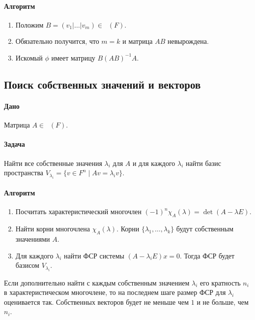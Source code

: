 \documentclass{article}
\newcommand{\MatrixDim}[3]{\mathop{\mathrm{M}_{#2\,#3}}(#1)}
\newcommand{\Matrix}[2]{\mathop{\mathrm{M}_{#2}}(#1)}
\begin{document}
\paragraph{Алгоритм}

\begin{enumerate}
\item Положим $B = (v_1|\ldots|v_m)\in \MatrixDim{F}{n}{m}$.

\item Обязательно получится, что $m = k$ и матрица $AB$ невырождена.

\item Искомый $\phi$ имеет матрицу $B(AB)^{-1}A$.

\end{enumerate}


\subsection{Поиск собственных значений и векторов}

\paragraph{Дано} Матрица $A\in\Matrix{F}{n}$.


\paragraph{Задача} Найти все собственные значения $\lambda_i$ для $A$ и для каждого $\lambda_i$ найти базис пространства $V_{\lambda_i} = \{v\in F^{n}\mid A v = \lambda_i v\}$.

\paragraph{Алгоритм}
\begin{enumerate}
\item Посчитать характеристический многочлен $(-1)^n\chi_A(\lambda) = \det(A-\lambda E)$.

\item Найти корни многочлена $\chi_A(\lambda)$. Корни $\{\lambda_1,\ldots,\lambda_k\}$ будут собственным значениями $A$.

\item Для каждого $\lambda_i$ найти ФСР системы $(A-\lambda_i E)x = 0$. Тогда ФСР будет базисом $V_{\lambda_i}$.
\end{enumerate}

Если дополнительно найти с каждым собственным значением $\lambda_i$ его кратность $n_i$ в характеристическом многочлене, то на последнем шаге размер ФСР для $\lambda_i$ оценивается так. Собственных векторов будет не меньше чем $1$ и не больше, чем $n_i$.
\end{document}
